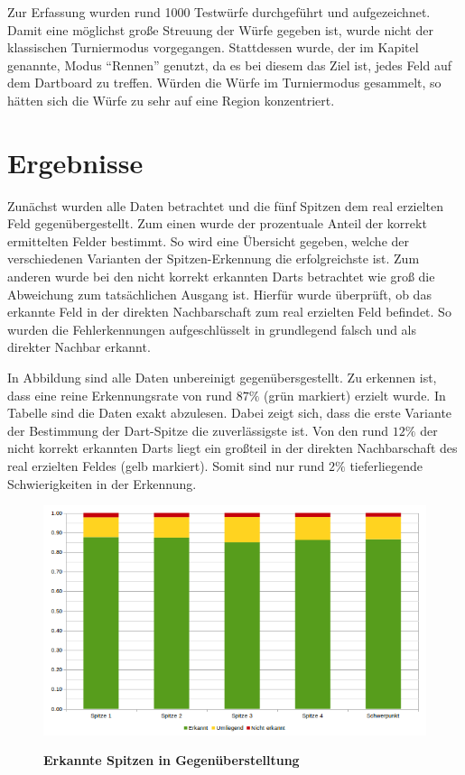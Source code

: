 Zur Erfassung wurden rund 1000  Testwürfe durchgeführt und aufgezeichnet. Damit eine möglichst große Streuung der Würfe gegeben ist, wurde nicht der klassischen Turniermodus vorgegangen. Stattdessen wurde, der im Kapitel  genannte, Modus "`Rennen"' genutzt, da es bei diesem das Ziel ist, jedes Feld auf dem Dartboard zu treffen. Würden die Würfe im Turniermodus gesammelt, so hätten sich die Würfe zu sehr auf eine Region konzentriert.


\section*{Ergebnisse}
\label{sec:results}
Zunächst wurden alle Daten betrachtet und die fünf Spitzen dem real erzielten Feld gegenübergestellt. Zum einen wurde der prozentuale Anteil der korrekt ermittelten Felder bestimmt. So wird eine Übersicht gegeben, welche der verschiedenen Varianten der Spitzen-Erkennung die erfolgreichste ist. Zum anderen wurde bei den nicht korrekt erkannten Darts betrachtet wie groß die Abweichung zum tatsächlichen Ausgang ist. Hierfür wurde überprüft, ob das erkannte Feld in der direkten Nachbarschaft zum real erzielten Feld befindet. So wurden die Fehlerkennungen aufgeschlüsselt in grundlegend falsch und als direkter Nachbar erkannt.


In Abbildung   sind alle Daten unbereinigt gegenübersgestellt. Zu erkennen ist, dass eine reine Erkennungsrate von rund $87\%$ (grün markiert) erzielt wurde. In Tabelle  sind die Daten exakt abzulesen. Dabei zeigt sich, dass die erste Variante der Bestimmung der Dart-Spitze die zuverlässigste ist. Von den rund $12\%$ der nicht korrekt erkannten Darts liegt ein großteil in der direkten Nachbarschaft des real erzielten Feldes (gelb markiert). Somit sind nur rund $2\%$ tieferliegende Schwierigkeiten in der Erkennung.
\begin{figure}[ht]
\centering
\includegraphics[width=\textwidth]{media/chartplain}\\
\caption{\textbf{Erkannte Spitzen in Gegenüberstelltung}}
\label{Fig:plainchart}
\end{figure}

